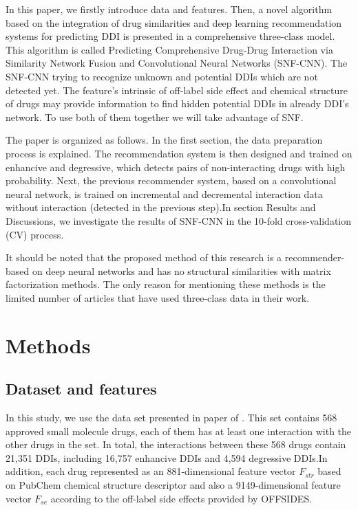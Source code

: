 \documentclass{bmcart}
\begin{document}
In this paper, we firstly introduce data and features. Then, a novel algorithm based on the integration of drug similarities and deep learning recommendation systems for predicting DDI is presented in a comprehensive three-class model. This algorithm is called Predicting Comprehensive Drug-Drug Interaction via Similarity Network Fusion and Convolutional Neural Networks (SNF-CNN). The SNF-CNN trying to recognize unknown and potential DDIs which are not detected yet. The feature's intrinsic of off-label side effect and chemical structure of drugs may provide information to find hidden potential DDIs in already DDI's network. To use both of them together we will take advantage of SNF.

The paper is organized as follows. In the first section, the data preparation process is explained. The recommendation system is then designed and trained on enhancive and degressive, which detects pairs of non-interacting drugs with high probability. Next, the previous recommender system, based on a convolutional neural network, is trained on incremental and decremental interaction data without interaction (detected in the previous step).In section Results and Discussions, we investigate the results of SNF-CNN in the 10-fold cross-validation (CV) process.

It should be noted that the proposed method of this research is a recommender-based on deep neural networks and has no structural similarities with matrix factorization methods. The only reason for mentioning these methods is the limited number of articles that have used three-class data in their work.

\section*{Methods}
\subsection*{Dataset and features}
In this study, we use the data set presented in paper of \cite{yu2018predicting}. This set contains 568 approved small molecule drugs, each of them has at least one interaction with the other drugs in the set. In total, the interactions between these 568 drugs contain 21,351 DDIs, including 16,757 enhancive DDIs and 4,594 degressive DDIs.In addition, each drug represented as an  881-dimensional feature vector $ F_ {str} $  based on PubChem chemical structure descriptor and also a 9149-dimensional feature vector $ F_ {se} $ according to the off-label side effects provided by OFFSIDES.
\end{document}
